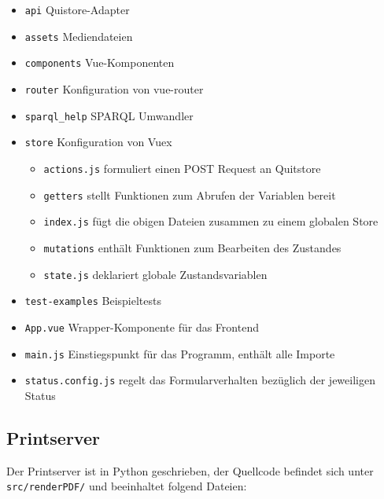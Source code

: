 \documentclass[a4paper,11pt,oneside, titlepage]{article}
\begin{document}
    \begin{itemize}
      \item \verb+api+ Quistore-Adapter
      \item \verb+assets+ Mediendateien
      \item \verb+components+ Vue-Komponenten
      \item \verb+router+ Konfiguration von vue-router
      \item \verb+sparql_help+ SPARQL Umwandler
      \item \verb+store+ Konfiguration von Vuex
        \begin{itemize}
          \item \verb+actions.js+ formuliert einen POST Request an Quitstore
          \item \verb+getters+ stellt Funktionen zum Abrufen der Variablen bereit
          \item \verb+index.js+ fügt die obigen Dateien zusammen zu einem globalen Store
          \item \verb+mutations+ enthält Funktionen zum Bearbeiten des Zustandes
          \item \verb+state.js+ deklariert globale Zustandsvariablen
        \end{itemize}
      \item \verb+test-examples+ Beispieltests
      \item \verb+App.vue+ Wrapper-Komponente für das Frontend
      \item \verb+main.js+ Einstiegspunkt für das Programm, enthält alle Importe
      \item \verb+status.config.js+ regelt das Formularverhalten bezüglich der jeweiligen Status
    \end{itemize}

\begin{minipage}{16cm}
\end{minipage}

\subsection{Printserver}
Der Printserver ist in Python geschrieben, der Quellcode befindet sich unter \verb|src/renderPDF/| und beeinhaltet folgend Dateien:
\end{document}
